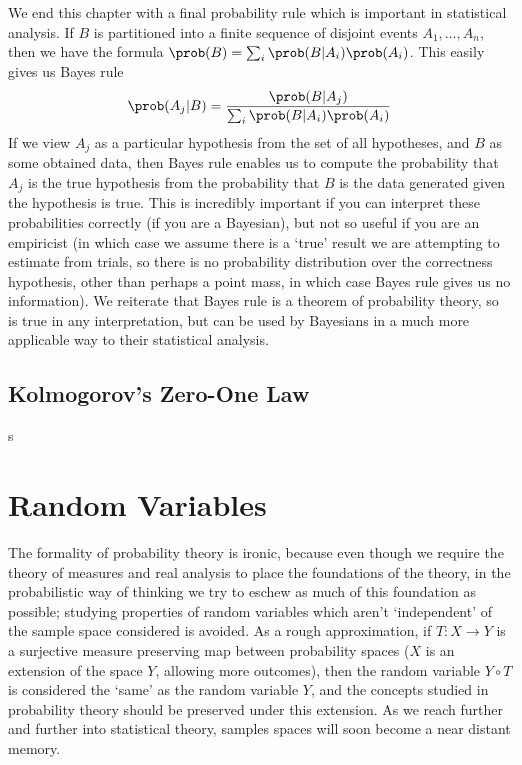 We end this chapter with a final probability rule which is important in statistical analysis. If $B$ is partitioned into a finite sequence of disjoint events $A_1, \dots, A_n$, then we have the formula $\prob(B) = \sum_i \prob(B | A_i) \prob(A_i)$. This easily gives us Bayes rule
%
\[ \prob(A_j | B) = \frac{\prob(B | A_j)}{\sum_i \prob(B | A_i) \prob(A_i)} \]
%
If we view $A_j$ as a particular hypothesis from the set of all hypotheses, and $B$ as some obtained data, then Bayes rule enables us to compute the probability that $A_j$ is the true hypothesis from the probability that $B$ is the data generated given the hypothesis is true. This is incredibly important if you can interpret these probabilities correctly (if you are a Bayesian), but not so useful if you are an empiricist (in which case we assume there is a `true' result we are attempting to estimate from trials, so there is no probability distribution over the correctness hypothesis, other than perhaps a point mass, in which case Bayes rule gives us no information). We reiterate that Bayes rule is a theorem of probability theory, so is true in any interpretation, but can be used by Bayesians in a much more applicable way to their statistical analysis.

\section{Kolmogorov's Zero-One Law}

s

\chapter{Random Variables}

The formality of probability theory is ironic, because even though we require the theory of measures and real analysis to place the foundations of the theory, in the probabilistic way of thinking we try to eschew as much of this foundation as possible; studying properties of random variables which aren't `independent' of the sample space considered is avoided. As a rough approximation, if $T: X \to Y$ is a surjective measure preserving map between probability spaces ($X$ is an extension of the space $Y$, allowing more outcomes), then the random variable $Y \circ T$ is considered the `same' as the random variable $Y$, and the concepts studied in probability theory should be preserved under this extension. As we reach further and further into statistical theory, samples spaces will soon become a near distant memory.

